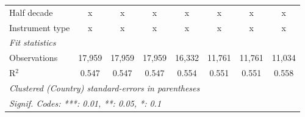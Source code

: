 \begin{tabular}{lccccccc}
   Half decade                                                                                                 & x       & x            & x       & x             & x       & x       & x\\  
   Instrument type                                                                                             & x       & x            & x       & x             & x       & x       & x\\  
   \midrule \emph{Fit statistics}\\
   Observations                                                                                                & 17,959  & 17,959       & 17,959  & 16,332        & 11,761  & 11,761  & 11,034\\  
   R$^2$                                                                                                       & 0.547   & 0.547        & 0.547   & 0.554         & 0.551   & 0.551   & 0.558\\  
   \midrule
   \multicolumn{8}{l}{\emph{Clustered (Country) standard-errors in parentheses}}\\
   \multicolumn{8}{l}{\emph{Signif. Codes: ***: 0.01, **: 0.05, *: 0.1}}\\
\end{tabular}
\par\endgroup



